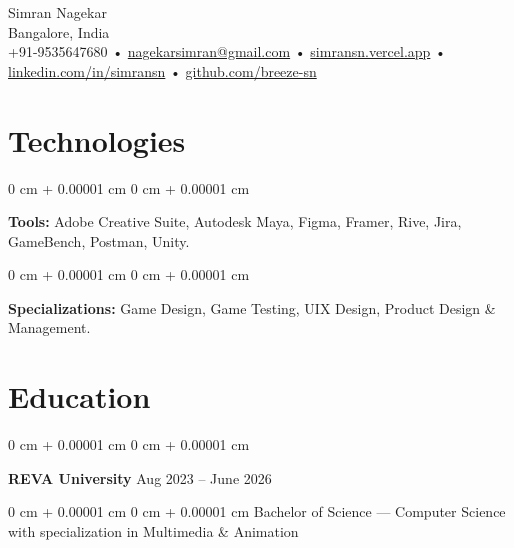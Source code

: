 \documentclass[10pt, letterpaper]{article}
\newenvironment{onecolentry}{
    \begin{adjustwidth}{
        0 cm + 0.00001 cm
    }{
        0 cm + 0.00001 cm
    }
}{
    \end{adjustwidth}
} %
\newenvironment{twocolentry}[2][]{
    \onecolentry
    \def\secondColumn{#2}
    \setcolumnwidth{\fill, 4.5 cm}
    \begin{paracol}{2}
}{
    \switchcolumn \raggedleft \secondColumn
    \end{paracol}
    \endonecolentry
} %
\newenvironment{header}{
    \setlength{\topsep}{0pt}\par\kern\topsep\raggedright\linespread{1.5}
}{
    \par\kern\topsep
} %
\begin{document}
    \newcommand{\AND}{\unskip
        \cleaders\copy\ANDbox\hskip\wd\ANDbox
        \ignorespaces
    }
    \newsavebox\ANDbox
    \sbox\ANDbox{$|$}

    \begin{header}
    {\color{secondaryColor} \fontsize{25pt}{25pt}\selectfont Simran Nagekar}\\
    \vspace{1pt}
    Bangalore, India\\
    \vspace{2pt}
     \color{secondaryColor}  +91-9535647680 • \href{mailto:nagekarsimran@gmail.com}{\color{secondaryColor}nagekarsimran@gmail.com} • \href{https://simransn.vercel.app/}{\color{secondaryColor}simransn.vercel.app} •
    \href{https://linkedin.com/in/simransn}{\color{secondaryColor}linkedin.com/in/simransn} •
    \href{https://github.com/breeze-sn}{\color{secondaryColor}github.com/breeze-sn}  
\end{header}

    \vspace{5 pt - 0.3 cm}

     
    \section{\color{secondaryColor}Technologies}


        \vspace{0.1 cm}

        \begin{onecolentry}
            \textbf{Tools:} Adobe Creative Suite, Autodesk Maya, Figma, Framer, Rive, Jira, GameBench, Postman, Unity.
        \end{onecolentry}

        \vspace{0.1 cm}

        \begin{onecolentry}
            \textbf{Specializations:} Game Design, Game Testing, UIX Design, Product Design & Management.
        \end{onecolentry}


    \section{\color{secondaryColor}Education} 
        \begin{twocolentry}{
            Aug 2023 – June 2026
        }
            \textbf{REVA University}\end{twocolentry}
            \begin{onecolentry} Bachelor of Science — Computer Science with specialization in Multimedia \& Animation \end{onecolentry}
\end{document}
